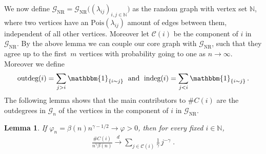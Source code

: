 \documentclass[12pt,a4paper]{article}
\numberwithin{equation}{section}
\newtheorem{lemma}[shared]{Lemma}
\begin{document}
We now define $\mathscr{G}_{\text{NR}}=\mathscr{G}_{\text{NR}}\big((\lambda_{ij})_{i,j\in\mathbb{N}}\big)$ as the random graph with vertex set $\mathbb N$, where two vertices have an $\text{Pois}(\lambda_{ij})$ amount of edges between them, independent of all other vertices. Moreover let $\mathcal{C}(i)$ be the component of $i$ in $\mathscr{G}_{\text{NR}}$. By the above lemma we can couple  our core graph with $\mathscr{G}_{\text{NR}}$, such that they 
agree up to the first~$m$ vertices with probability going to one as $n\to\infty$.
Moreover we define
$$\text{outdeg}(i)=\sum_{j>i}\mathbbm{1}_{\{i\sim j\}}\;\text{ and }\;\text{indeg}(i)=\sum_{j<i}\mathbbm{1}_{\{i\sim j\}}\,.$$
The following lemma shows that the main contributors to $\# C(i)$ are the outdegrees in $\mathscr{G}_n$ of the vertices in the component of $i$ in $\mathscr{G}_{\text{NR}}$.

\begin{lemma}\label{3.9}
If $\varphi_n=\beta(n)n^{\gamma -1/2} \to \varphi >0$, then 
for every fixed $i\in\mathbb N$,  
\begin{align}\label{pwc}
    \frac{\# C(i)}{n^\gamma \beta(n)}\overset{d}{\longrightarrow} \sum_{j\in\mathcal C(i)} \frac{1}{\gamma}\, j^{-\gamma} \;.
\end{align}
\end{lemma}
\end{document}
